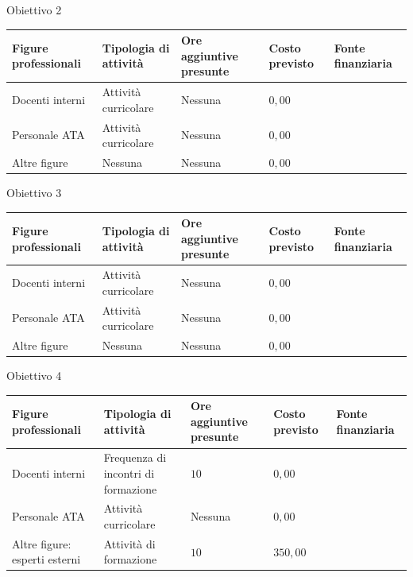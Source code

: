 \documentclass[12pt,a4paper,oneside]{memoir}
\begin{document}
\begin{table}[htp]
\normalsize{Obiettivo 2}\\

\footnotesize
\begin{tabular}{|>{\raggedright}p{2.249851cm}|>{\raggedright}p{2.249851cm}|>{\raggedright}p{2.249851cm}|>{\raggedright}p{2.249851cm}|>{\raggedright\arraybackslash}p{2.249851cm}|}\hline
\rowcolor{violetto}
Figure professionali&Tipologia di attività&Ore aggiuntive presunte&Costo previsto&Fonte finanziaria\\\hline
Docenti interni&Attività curricolare&Nessuna&$0,00$&\\\hline
Personale ATA&Attività curricolare&Nessuna&$0,00$&\\\hline
Altre figure&Nessuna&Nessuna&$0,00$&\\\hline
\end{tabular}

\vspace{1em}

\normalsize{Obiettivo 3}\\

\footnotesize
\begin{tabular}{|>{\raggedright}p{2.249851cm}|>{\raggedright}p{2.249851cm}|>{\raggedright}p{2.249851cm}|>{\raggedright}p{2.249851cm}|>{\raggedright\arraybackslash}p{2.249851cm}|}\hline
\rowcolor{violetto}
Figure professionali&Tipologia di attività&Ore aggiuntive presunte&Costo previsto&Fonte finanziaria\\\hline
Docenti interni&Attività curricolare&Nessuna&$0,00$&\\\hline
Personale ATA&Attività curricolare&Nessuna&$0,00$&\\\hline
Altre figure&Nessuna&Nessuna&$0,00$&\\\hline
\end{tabular}

\vspace{1em}

\normalsize{Obiettivo 4}\\

\footnotesize
\begin{tabular}{|>{\raggedright}p{2.249851cm}|>{\raggedright}p{2.249851cm}|>{\raggedright}p{2.249851cm}|>{\raggedright}p{2.249851cm}|>{\raggedright\arraybackslash}p{2.249851cm}|}\hline
\rowcolor{violetto}
Figure professionali&Tipologia di attività&Ore aggiuntive presunte&Costo previsto&Fonte finanziaria\\\hline
Docenti interni&Frequenza di incontri di formazione&$10$&$0,00$&\\\hline
Personale ATA&Attività curricolare&Nessuna&$0,00$&\\\hline
Altre figure: esperti esterni&Attività di formazione&$10$&$350,00$&\\\hline
\end{tabular}
\end{table}
\end{document}
